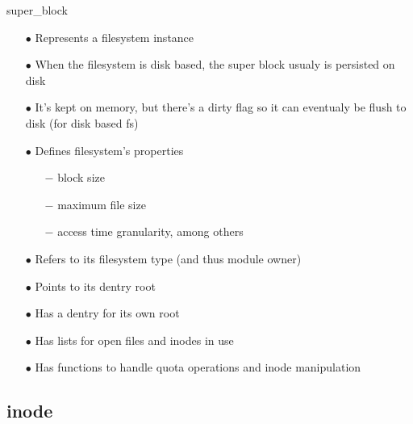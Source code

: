 \documentclass{beamer}
\begin{document}
\begin{frame}{super\_block}
	
	\begin{itemize}[<+->]

		\item[$\bullet$]{Represents a filesystem instance}
		\item[$\bullet$]{When the filesystem is disk based, the super block usualy is persisted on disk}		
		\item[$\bullet$]{It's kept on memory, but there's a dirty flag so it can eventualy be flush to disk (for disk based fs)}
		\item[$\bullet$]{Defines filesystem's properties}
			\begin{itemize}
				\item[$-$]{block size}
				\item[$-$]{maximum file size}
				\item[$-$]{access time granularity, among others}
			\end{itemize}	
		
		\item[$\bullet$]{Refers to its filesystem type (and thus module owner)}
		\item[$\bullet$]{Points to its dentry root}
		\item[$\bullet$]{Has a dentry for its own root}
		\item[$\bullet$]{Has lists for open files and inodes in use}
		\item[$\bullet$]{Has functions to handle quota operations and inode manipulation}
		
	\end{itemize}

\end{frame}

\subsection{inode}
\end{document}
